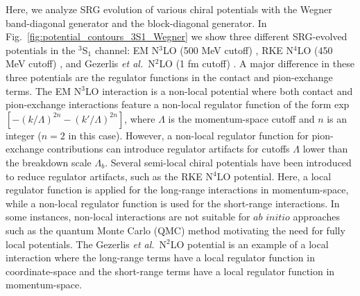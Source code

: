\documentclass[preprintnumbers,floatfix,aps,prc,preprint,nofootinbib]{revtex4-1}
\begin{document}
%
Here, we analyze SRG evolution of various chiral potentials with the Wegner band-diagonal generator and the block-diagonal generator. In Fig.~\ref{fig:potential_contours_3S1_Wegner} we show three different SRG-evolved potentials in the $^3$S$_1$ channel: EM N$^3$LO (500 MeV cutoff) \cite{Entem:2003ft}, RKE N$^4$LO (450 MeV cutoff) \cite{Reinert:2017usi}, and Gezerlis \textit{et al.}~N$^2$LO (1 fm cutoff) \cite{Gezerlis:2014zia}. A major difference in these three potentials are the regulator functions in the contact and pion-exchange terms. The EM N$^3$LO interaction is a non-local potential where both contact and pion-exchange interactions feature a non-local regulator function of the form exp$[-(k/\Lambda)^{2n}-(k'/\Lambda)^{2n}]$, where $\Lambda$ is the momentum-space cutoff and $n$ is an integer ($n=2$ in this case). However, a non-local regulator function for pion-exchange contributions can introduce regulator artifacts for cutoffs $\Lambda$ lower than the breakdown scale $\Lambda_b$. Several semi-local chiral potentials have been introduced to reduce regulator artifacts, such as the RKE N$^4$LO potential. Here, a local regulator function is applied for the long-range interactions in momentum-space, while a non-local regulator function is used for the short-range interactions. In some instances, non-local interactions are not suitable for $\textit{ab initio}$ approaches such as the quantum Monte Carlo (QMC) method motivating the need for fully local potentials. The Gezerlis \textit{et al.}~N$^2$LO potential is an example of a local interaction where the long-range terms have a local regulator function in coordinate-space and the short-range terms have a local regulator function in momentum-space.
\\
\end{document}
